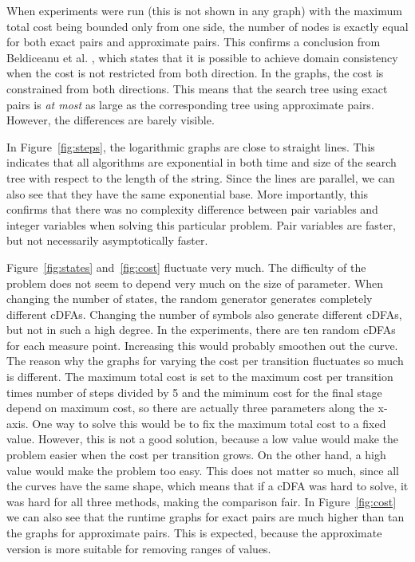 \documentclass[a4paper,11pt]{article}
\begin{document}
When experiments were run (this is not shown in any graph) with the maximum total cost being bounded only from one side, the number of nodes is exactly equal for both exact pairs and approximate pairs. This confirms a conclusion from Beldiceanu et al. \cite{Beldiceanu675954}, which states that it is possible to achieve domain consistency when the cost is not restricted from both direction. In the graphs, the cost is constrained from both directions. This means that the search tree using exact pairs is \textit{at most} as large as the corresponding tree using approximate pairs. However, the differences are barely visible.

In Figure~\ref{fig:steps}, the logarithmic graphs are close to straight lines. This indicates that all algorithms are exponential in both time and size of the search tree with respect to the length of the string. Since the lines are parallel, we can also see that they have the same exponential base. More importantly, this confirms that there was no complexity difference between pair variables and integer variables when solving this particular problem. Pair variables are faster, but not necessarily asymptotically faster. 

Figure~\ref{fig:states} and~\ref{fig:cost} fluctuate very much. The difficulty of the problem does not seem to depend very much on the size of parameter. When changing the number of states, the random generator generates completely different cDFAs. Changing the number of symbols also generate different cDFAs, but not in such a high degree. In the experiments, there are ten random cDFAs for each measure point. Increasing this would probably smoothen out the curve. The reason why the graphs for varying the cost per transition fluctuates so much is different. The maximum total cost is set to the maximum cost per transition times number of steps divided by 5 and the miminum cost for the final stage depend on maximum cost, so there are actually three parameters along the x-axis. One way to solve this would be to fix the maximum total cost to a fixed value. However, this is not a good solution, because a low value would make the problem easier when the cost per transition grows. On the other hand, a high value would make the problem too easy. This does not matter so much, since all the curves have the same shape, which means that if a cDFA was hard to solve, it was hard for all three methods, making the comparison fair. In Figure~\ref{fig:cost} we can also see that the runtime graphs for exact pairs are much higher than tan the graphs for approximate pairs. This is expected, because the approximate version is more suitable for removing ranges of values.
\end{document}
